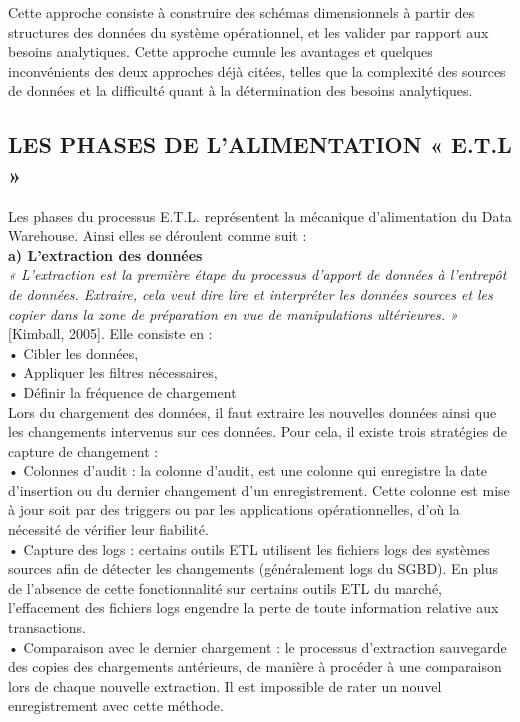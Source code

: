 Cette approche consiste à construire des schémas dimensionnels à partir des structures des données du système opérationnel, et les valider par rapport aux besoins analytiques. Cette approche cumule les avantages et quelques inconvénients des deux approches déjà citées, telles que la complexité des sources de données et la difficulté quant à la détermination des besoins analytiques.


\subsection{LES PHASES DE L'ALIMENTATION « E.T.L »}

Les phases du processus E.T.L. représentent la mécanique d’alimentation du Data
Warehouse. Ainsi elles se déroulent comme suit :\\
\textbf{a) L’extraction des données}\\

\textit{« L’extraction est la première étape du processus d’apport de données à l’entrepôt de données. Extraire, cela veut dire lire et interpréter les données sources et les copier dans la zone de préparation en vue de manipulations ultérieures. »} [Kimball, 2005]. Elle consiste en :\\

 •	Cibler les données,\\
 •	Appliquer les filtres nécessaires,\\
 •	Définir la fréquence de chargement\\

Lors du chargement des données, il faut extraire les nouvelles données ainsi que les changements intervenus sur ces données. Pour cela, il existe trois stratégies de capture de changement :\\
• Colonnes d’audit : la colonne d’audit, est une colonne qui enregistre la date d’insertion ou du dernier changement d’un enregistrement. Cette colonne est mise à jour soit par des triggers ou par les applications opérationnelles, d’où la nécessité de vérifier leur fiabilité.\\
\quad •	Capture des logs : certains outils ETL utilisent les fichiers logs des systèmes sources afin de détecter les changements (généralement logs du SGBD). En plus de l’absence de cette fonctionnalité sur certains outils ETL du marché, l’effacement des fichiers logs engendre la perte de toute information relative aux transactions.\\
\qquad • Comparaison avec le dernier chargement : le processus d’extraction sauvegarde des copies des chargements antérieurs, de manière à procéder à une comparaison lors de chaque nouvelle extraction. Il est impossible de rater un nouvel enregistrement avec cette méthode.


